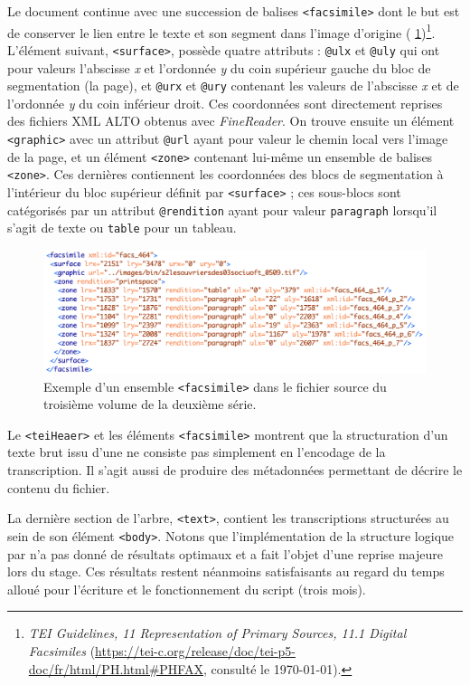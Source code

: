 Le document continue avec une succession de balises \texttt{<facsimile>} dont le but est de conserver le lien entre le texte et son segment dans l'image d'origine (\fig{} \ref{fig:facsimile})\footnote{\textit{TEI Guidelines, 11 Representation of Primary Sources, 11.1 Digital Facsimiles} (\url{https://tei-c.org/release/doc/tei-p5-doc/fr/html/PH.html\#PHFAX}, consulté le \today).}. L'élément suivant, \texttt{<surface>}, possède quatre attributs : \texttt{@ulx} et \texttt{@uly} qui ont pour valeurs l'abscisse \textit{x} et l'ordonnée \textit{y} du coin supérieur gauche du bloc de segmentation (la page), et \texttt{@urx} et \texttt{@ury} contenant les valeurs de l'abscisse \textit{x} et de l'ordonnée \textit{y} du coin inférieur droit. Ces coordonnées sont directement reprises des fichiers XML ALTO obtenus avec \textit{FineReader}. On trouve ensuite un élément \texttt{<graphic>} avec un attribut \texttt{@url} ayant pour valeur le chemin local vers l'image de la page, et un élément \texttt{<zone>} contenant lui-même un ensemble de balises \texttt{<zone>}. Ces dernières contiennent les coordonnées des blocs de segmentation à l'intérieur du bloc supérieur définit par \texttt{<surface>} ; ces sous-blocs sont catégorisés par un attribut \texttt{@rendition} ayant pour valeur \texttt{paragraph} lorsqu'il s'agit de texte ou \texttt{table} pour un tableau.

\begin{figure}
    \centering
    \includegraphics[width=16cm]{img/facsimile.png}
    \caption[Exemple d'un ensemble \texttt{<facsimile>}]{Exemple d'un ensemble \texttt{<facsimile>} dans le fichier source du troisième volume de la deuxième série.}
    \label{fig:facsimile}
\end{figure}

Le \texttt{<teiHeaer>} et les éléments \texttt{<facsimile>} montrent que la structuration d'un texte brut issu d'une \ocr{} ne consiste pas simplement en l'encodage de la transcription. Il s'agit aussi de produire des métadonnées permettant de décrire le contenu du fichier.

La dernière section de l'arbre, \texttt{<text>}, contient les transcriptions structurées au sein de son élément \texttt{<body>}. Notons que l'implémentation de la structure logique par \lse{} n'a pas donné de résultats optimaux et a fait l'objet d'une reprise majeure lors du stage. Ces résultats restent néanmoins satisfaisants au regard du temps alloué pour l'écriture et le fonctionnement du  script (trois mois). 

